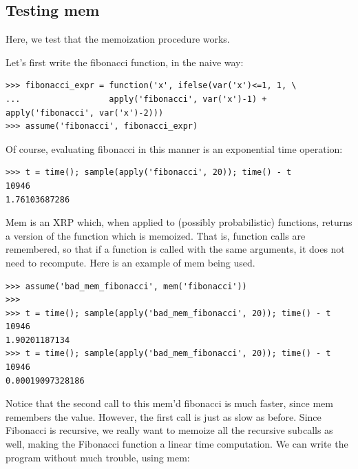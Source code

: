 \documentclass[11pt]{article}
\begin{document}

\subsection{Testing mem}

Here, we test that the memoization procedure works.  

\noindent Let's first write the fibonacci function, in the naive way:

\begin{small}
\begin{verbatim}
>>> fibonacci_expr = function('x', ifelse(var('x')<=1, 1, \
...                  apply('fibonacci', var('x')-1) + apply('fibonacci', var('x')-2)))
>>> assume('fibonacci', fibonacci_expr)
\end{verbatim}
\end{small}

\noindent Of course, evaluating fibonacci in this manner is an exponential time operation:

\begin{small}
\begin{verbatim}
>>> t = time(); sample(apply('fibonacci', 20)); time() - t
10946
1.76103687286
\end{verbatim}
\end{small}

\noindent Mem is an XRP which, when applied to (possibly probabilistic) functions, returns a version of the function which is memoized.  That is, function calls are remembered, so that if a function is called with the same arguments, it does not need to recompute.  Here is an example of mem being used.

\begin{small}
\begin{verbatim}
>>> assume('bad_mem_fibonacci', mem('fibonacci'))
>>>
>>> t = time(); sample(apply('bad_mem_fibonacci', 20)); time() - t
10946
1.90201187134
>>> t = time(); sample(apply('bad_mem_fibonacci', 20)); time() - t
10946
0.00019097328186
\end{verbatim}
\end{small}

\noindent Notice that the second call to this mem'd fibonacci is much faster, since mem remembers the value.  However, the first call is just as slow as before.  Since Fibonacci is recursive, we really want to memoize all the recursive subcalls as well, making the Fibonacci function a linear time computation.  We can write the program without much trouble, using mem:
\end{document}
